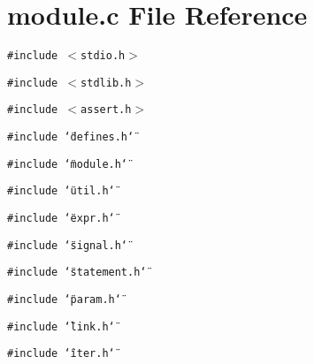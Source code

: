 \section{module.c File Reference}
\label{module_8c}
{\tt \#include $<$stdio.h$>$}\par
{\tt \#include $<$stdlib.h$>$}\par
{\tt \#include $<$assert.h$>$}\par
{\tt \#include \char`\"{}defines.h\char`\"{}}\par
{\tt \#include \char`\"{}module.h\char`\"{}}\par
{\tt \#include \char`\"{}util.h\char`\"{}}\par
{\tt \#include \char`\"{}expr.h\char`\"{}}\par
{\tt \#include \char`\"{}signal.h\char`\"{}}\par
{\tt \#include \char`\"{}statement.h\char`\"{}}\par
{\tt \#include \char`\"{}param.h\char`\"{}}\par
{\tt \#include \char`\"{}link.h\char`\"{}}\par
{\tt \#include \char`\"{}iter.h\char`\"{}}\par
